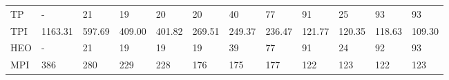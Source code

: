 \begin{table*}
{\begin{tabular}{llllllllllll}
TP       &                - &                21 &                19 &                20 &                20 &                40 &               77 &               91 &               25 &                93 &               93 \\
TPI      &          1163.31 &            597.69 &            409.00 &            401.82 &            269.51 &            249.37 &           236.47 &           121.77 &           120.35 &            118.63 &           109.30 \\
HEO      &                - &                21 &                19 &                19 &                19 &                39 &               77 &               91 &               24 &                92 &               93 \\
MPI      &              386 &               280 &               229 &               228 &               176 &               175 &              177 &              122 &              123 &               122 &              123 \\
\bottomrule
\end{tabular}}
\end{table*}
